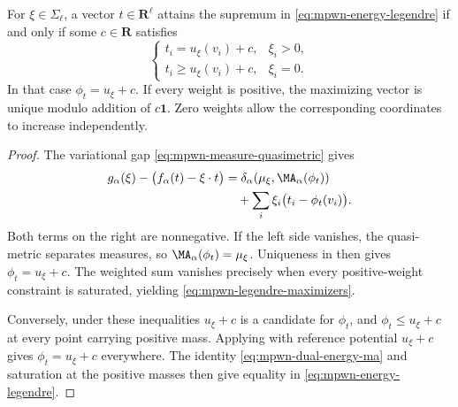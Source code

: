 \noindent\begin{minipage}{\linewidth}
\begin{proposition}\label{prop:mpwn-legendre-maximizers}
For $\xi\in\Sigma_\ell$, a vector $t\in\mathbf R^\ell$ attains the supremum in \eqref{eq:mpwn-energy-legendre} if and only if some $c\in\mathbf R$ satisfies
\[
 \begin{cases}
 t_i=u_\xi(v_i)+c,&\xi_i>0,\\
 t_i\geq u_\xi(v_i)+c,&\xi_i=0.
 \end{cases}
\tag{62.23a}\label{eq:mpwn-legendre-maximizers}
\]
In that case $\phi_t=u_\xi+c$. If every weight is positive, the maximizing vector is unique modulo addition of $c\mathbf1$. Zero weights allow the corresponding coordinates to increase independently.
\end{proposition}
\end{minipage}\par

\begin{proof}
The variational gap \eqref{eq:mpwn-measure-quasimetric} gives
\[
 \begin{aligned}
 g_\alpha(\xi)-\bigl(f_\alpha(t)-\xi\cdot t\bigr)
 &=\delta_\alpha(\mu_\xi,\MA_\alpha(\phi_t))\\
 &\quad+\sum_i\xi_i\bigl(t_i-\phi_t(v_i)\bigr).
 \end{aligned}
\]
Both terms on the right are nonnegative. If the left side vanishes, the quasi-metric separates measures, so $\MA_\alpha(\phi_t)=\mu_\xi$. Uniqueness in  then gives $\phi_t=u_\xi+c$. The weighted sum vanishes precisely when every positive-weight constraint is saturated, yielding \eqref{eq:mpwn-legendre-maximizers}.

Conversely, under these inequalities $u_\xi+c$ is a candidate for $\phi_t$, and $\phi_t\leq u_\xi+c$ at every point carrying positive mass. Applying  with reference potential $u_\xi+c$ gives $\phi_t=u_\xi+c$ everywhere. The identity \eqref{eq:mpwn-dual-energy-ma} and saturation at the positive masses then give equality in \eqref{eq:mpwn-energy-legendre}.
\end{proof}

